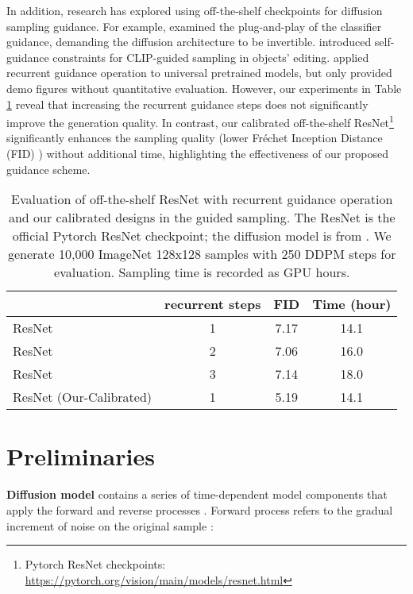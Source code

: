 \documentclass{article}
\theoremstyle{definition}
\begin{document}
In addition, research has explored using off-the-shelf checkpoints for diffusion sampling guidance. For example, \cite{wallace2023end} examined the plug-and-play of the classifier guidance, demanding the diffusion architecture to be invertible.  
\cite{epstein2023diffusion} introduced self-guidance constraints for CLIP-guided sampling in objects' editing. 
\cite{bansal2023universal} applied recurrent guidance operation to universal pretrained models, but only provided demo figures without quantitative evaluation. However, our experiments in Table \ref{table:recurrent_guidance_result} reveal that increasing the recurrent guidance steps does not significantly improve the generation quality. In contrast, our calibrated off-the-shelf ResNet\footnote{Pytorch ResNet checkpoints: \url{https://pytorch.org/vision/main/models/resnet.html}} significantly enhances the sampling quality (lower Fréchet Inception Distance (FID) \citep{heusel2017gans}) without additional time, highlighting the effectiveness of our proposed guidance scheme.


\begin{table}[h!]
\caption{Evaluation of off-the-shelf ResNet with recurrent guidance operation and our calibrated designs in the guided sampling. The ResNet is the official Pytorch ResNet checkpoint; the diffusion model is from \cite{dhariwal2021diffusion}. We generate 10,000 ImageNet 128x128 samples with 250 DDPM steps for evaluation. Sampling time is recorded as GPU hours.}
\label{table:recurrent_guidance_result}
\begin{center}
\begin{small}
\begin{tabular}{lccc}
\toprule
  & recurrent steps & FID & Time (hour)\\
\midrule
ResNet   & 1 &  7.17 & 14.1  \\  
ResNet    & 2 &  7.06 & 16.0  \\  
ResNet   & 3 &  7.14 & 18.0 \\   
ResNet (Our-Calibrated)  & 1 &  5.19 & 14.1 \\ 
\bottomrule
\end{tabular}
\end{small}
\end{center}
\end{table}


\section{Preliminaries}
\textbf{Diffusion model} contains a series of time-dependent model components that apply the forward and reverse processes \citep{sohl2015deep, ho2020denoising}. Forward process refers to the gradual increment of noise on the original sample : 
\end{document}
